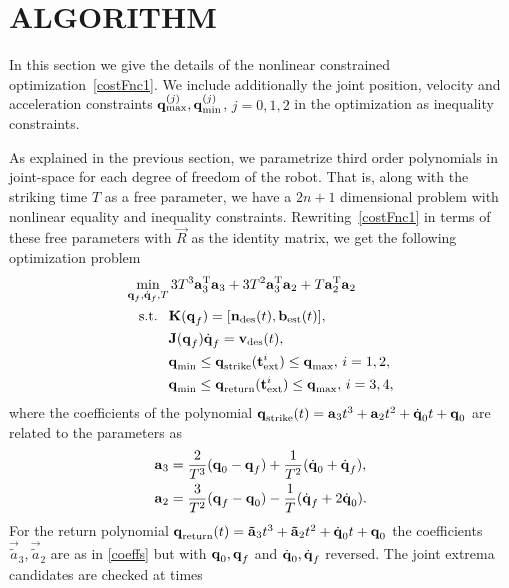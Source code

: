 \section{ALGORITHM}\label{alg}

In this section we give the details of the nonlinear constrained optimization~\eqref{costFnc1}. We include additionally the joint position, velocity and acceleration constraints $\boldsymbol{\mathrm{q}}_{\mathrm{max}}^{(j)}, \boldsymbol{\mathrm{q}}_{\mathrm{min}}^{(j)}$, $j = 0, 1, 2$ in the optimization as inequality constraints. 

As explained in the previous section, we parametrize third order polynomials in joint-space for each degree of freedom of the robot. That is, along with the striking time $T$ as a free parameter, we have a $2n+1$ dimensional problem with nonlinear equality and inequality constraints. Rewriting~\eqref{costFnc1} in terms of these free parameters with $\vec{R}$ as the identity matrix, we get the following optimization problem
%
\begin{align}
\min_{\boldsymbol{\mathrm{q}}_f,\dot{\boldsymbol{\mathrm{q}}}_f, T} & \, 3T^3 \boldsymbol{\mathrm{a}}_3^{\mathrm{T}}\boldsymbol{\mathrm{a}}_3 + 3T^2 \boldsymbol{\mathrm{a}}_3^{\mathrm{T}}\boldsymbol{\mathrm{a}}_2 + T\boldsymbol{\mathrm{a}}_2^{\mathrm{T}}\boldsymbol{\mathrm{a}}_2 \label{costFnc2} \\
\textrm{s.t. \ }
& \boldsymbol{\mathrm{K}}(\boldsymbol{\mathrm{q}}_f) = [\boldsymbol{\mathrm{n}}_{\mathrm{des}}(t),\boldsymbol{\mathrm{b}}_{\mathrm{est}}(t)], \\
&\boldsymbol{\mathrm{J}}(\boldsymbol{\mathrm{q}}_f)\dot{\boldsymbol{\mathrm{q}}}_f = \boldsymbol{\mathrm{v}}_{\mathrm{des}}(t), \\
& \boldsymbol{\mathrm{q}}_{\mathrm{min}} \leq \boldsymbol{\mathrm{q}}_{\mathrm{strike}}(\boldsymbol{\mathrm{t}}_{\mathrm{ext}}^{i}) \leq \boldsymbol{\mathrm{q}}_{\mathrm{max}}, \, i = 1,2, \\
& \boldsymbol{\mathrm{q}}_{\mathrm{min}} \leq \boldsymbol{\mathrm{q}}_{\mathrm{return}}(\boldsymbol{\mathrm{t}}_{\mathrm{ext}}^{i}) \leq \boldsymbol{\mathrm{q}}_{\mathrm{max}}, \, i = 3,4,
\end{align}
%
\noindent where the coefficients of the polynomial $\boldsymbol{\mathrm{q}}_{\mathrm{strike}}(t) = \boldsymbol{\mathrm{a}}_3 t^3  + \boldsymbol{\mathrm{a}}_2 t^2 + \dot{\boldsymbol{\mathrm{q}}}_0 t + \boldsymbol{\mathrm{q}}_0$ are related to the parameters as 
%
\begin{align}
\boldsymbol{\mathrm{a}}_3 &= \frac{2}{T^3}(\boldsymbol{\mathrm{q}}_0 - \boldsymbol{\mathrm{q}}_f) + \frac{1}{T^2}(\dot{\boldsymbol{\mathrm{q}}}_0 + \dot{\boldsymbol{\mathrm{q}}}_f), \\
\boldsymbol{\mathrm{a}}_2 &= \frac{3}{T^2}(\boldsymbol{\mathrm{q}}_f - \boldsymbol{\mathrm{q}}_0) - \frac{1}{T}(\dot{\boldsymbol{\mathrm{q}}}_f + 2\dot{\boldsymbol{\mathrm{q}}}_0).
\label{coeffs}
\end{align}
%
For the return polynomial $\boldsymbol{\mathrm{q}}_{\mathrm{return}}(t) = \boldsymbol{\mathrm{\tilde{a}}}_3 t^3  + \boldsymbol{\mathrm{\tilde{a}}}_2 t^2 + \dot{\boldsymbol{\mathrm{q}}}_0 t + \boldsymbol{\mathrm{q}}_0$ the coefficients $\vec{\tilde{a}}_3, \vec{\tilde{a}}_2$ are as in \eqref{coeffs} but with $\boldsymbol{\mathrm{q}}_0, \boldsymbol{\mathrm{q}}_f$ and $\dot{\boldsymbol{\mathrm{q}}}_0, \dot{\boldsymbol{\mathrm{q}}}_f$ reversed. The joint extrema candidates are checked at times
